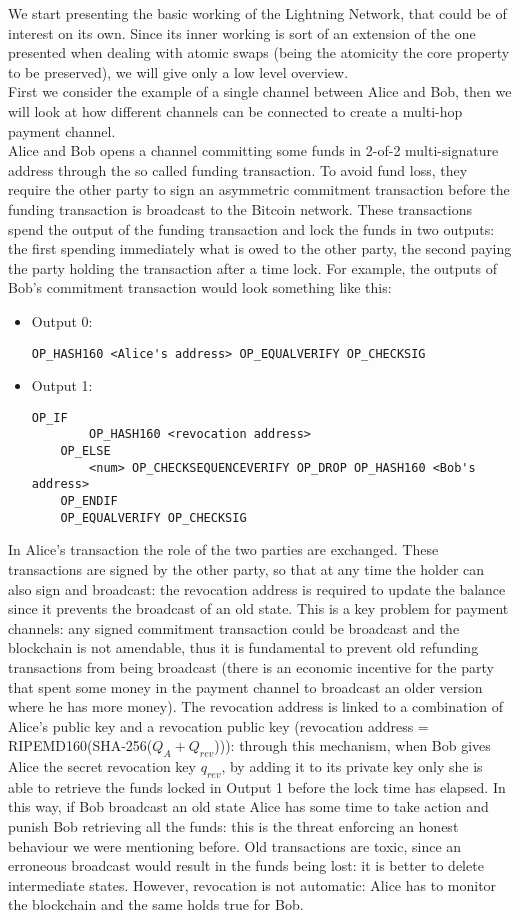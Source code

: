 We start presenting the basic working of the Lightning Network, that could be of interest on its own. Since its inner working is sort of an extension of the one presented when dealing with atomic swaps (being the atomicity the core property to be preserved), we will give only a low level overview.
\\
First we consider the example of a single channel between Alice and Bob, then we will look at how different channels can be connected to create a multi-hop payment channel.
\\
Alice and Bob opens a channel committing some funds in 2-of-2 multi-signature address through the so called funding transaction. To avoid fund loss, they require the other party to sign an asymmetric commitment transaction before the funding transaction is broadcast to the Bitcoin network. These transactions spend the output of the funding transaction and lock the funds in two outputs: the first spending immediately what is owed to the other party, the second paying the party holding the transaction after a time lock. For example, the outputs of Bob's commitment transaction would look something like this:
\begin{itemize}
\item Output 0:
	\begin{lstlisting}[frame=single]
	OP_HASH160 <Alice's address> OP_EQUALVERIFY OP_CHECKSIG\end{lstlisting}
	
\item Output 1:
	\begin{lstlisting}[frame=single]
	OP_IF
		OP_HASH160 <revocation address>
	OP_ELSE
		<num> OP_CHECKSEQUENCEVERIFY OP_DROP OP_HASH160 <Bob's address> 
	OP_ENDIF
	OP_EQUALVERIFY OP_CHECKSIG\end{lstlisting}
\end{itemize}
In Alice's transaction the role of the two parties are exchanged. These transactions are signed by the other party, so that at any time the holder can also sign and broadcast: the revocation address is required to update the balance since it prevents the broadcast of an old state. This is a key problem for payment channels: any signed commitment transaction could be broadcast and the blockchain is not amendable, thus it is fundamental to prevent old refunding transactions from being broadcast (there is an economic incentive for the party that spent some money in the payment channel to broadcast an older version where he has more money). The revocation address is linked to a combination of Alice's public key and a revocation public key (revocation address = RIPEMD160(SHA-256($Q_A + Q_{rev}$))): through this mechanism, when Bob gives Alice the secret revocation key $q_{rev}$, by adding it to its private key only she is able to retrieve the funds locked in Output 1 before the lock time has elapsed. In this way, if Bob broadcast an old state Alice has some time to take action and punish Bob retrieving all the funds: this is the threat enforcing an honest behaviour we were mentioning before. Old transactions are toxic, since an erroneous broadcast would result in the funds being lost: it is better to delete intermediate states. However, revocation is not automatic: Alice has to monitor the blockchain and the same holds true for Bob.
